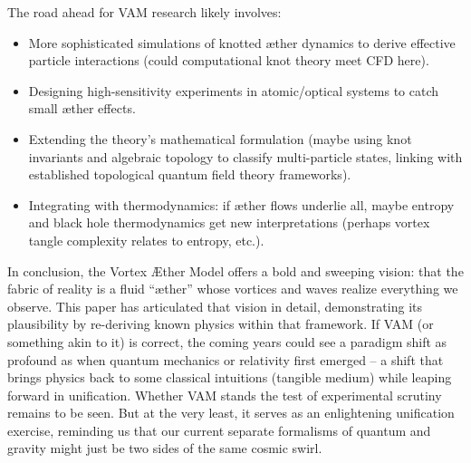 \documentclass[a4paper,12pt]{article}
\begin{document}
    The road ahead for VAM research likely involves:
    \begin{itemize}
    \item More sophisticated simulations of knotted æther dynamics to derive effective particle interactions (could computational knot theory meet CFD here).
    \item Designing high-sensitivity experiments in atomic/optical systems to catch small æther effects.
    \item Extending the theory’s mathematical formulation (maybe using knot invariants and algebraic topology to classify multi-particle states, linking with established topological quantum field theory frameworks).
    \item Integrating with thermodynamics: if æther flows underlie all, maybe entropy and black hole thermodynamics get new interpretations (perhaps vortex tangle complexity relates to entropy, etc.).
\end{itemize}
    In conclusion, the Vortex Æther Model offers a bold and sweeping vision: that the fabric of reality is a fluid “æther” whose vortices and waves realize everything we observe. This paper has articulated that vision in detail, demonstrating its plausibility by re-deriving known physics within that framework. If VAM (or something akin to it) is correct, the coming years could see a paradigm shift as profound as when quantum mechanics or relativity first emerged – a shift that brings physics back to some classical intuitions (tangible medium) while leaping forward in unification. Whether VAM stands the test of experimental scrutiny remains to be seen. But at the very least, it serves as an enlightening unification exercise, reminding us that our current separate formalisms of quantum and gravity might just be two sides of the same cosmic swirl.

        {\scriptsize
        }
\end{document}
